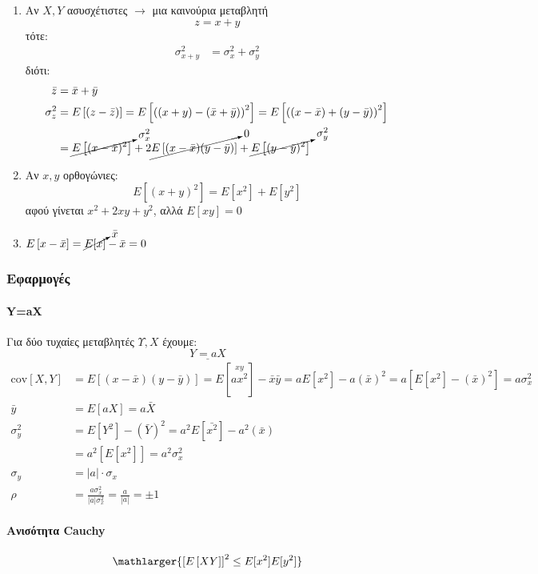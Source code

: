\documentclass[11pt,a4paper,notitlepage,fleqn,final]{article}
\begin{document}
\begin{enumerate}
	\item
	Αν \( X,Y \) ασυσχέτιστες \( \rightarrow \) μια καινούρια
	μεταβλητή \[
	z = x+y
	\] τότε:
	\begin{align*}
	\sigma_{x+y}^2 &= \sigma_x^2+\sigma_y^2
	\end{align*}
	διότι: \begin{align*}
	\bar z &= \bar x + \bar y \\
	\sigma_z^2 &= E\left[(z-\bar z)\right] = E\left[
	\left((x+y)-(\bar x+\bar y)\right)^2
	\right]
	= E\left[
	\left((x-\bar x)+(y-\bar y)\right)^2
	\right] \\ &=
	\cancelto{\sigma_x^2}{E\left[(x-\bar x)^2\right]}
	+ 2\cancelto{0}{E\left[(x-\bar x)(y-\bar y)\right]}
	+ \cancelto{\sigma_y^2}{E\left[(y-\bar y)^2\right]}
	\end{align*}
	\item Αν \( x,y \) ορθογώνιες:
	\[
	E\left[(x+y)^2\right] = E[x^2]+E[y^2]
	\] αφού γίνεται \( x^2+2xy+y^2 \), αλλά \( E[xy]=0 \)
	\item \( \displaystyle
	E\left[x-\bar x\right] = \cancelto{\bar x}{E[x]} - \bar x
	= 0
	\)
\end{enumerate}

\subsubsection{Εφαρμογές}

\paragraph{Y=aX}
Για δύο τυχαίες μεταβλητές \( Υ,Χ \) έχουμε:
\[
\underline{Y= aX}
\]
\begin{align*}
	\mathrm{cov}[X,Y] &= E\left[(x-\bar x)(y-\bar y)\right]
	= E\left[\overset{xy}{ax^2}\right] - \bar x \bar y
	= aE[x^2]-a(\bar x)^2 = a\left[E[x^2]-(\bar x)^2\right]
	= a\sigma_x^2 \\
	\bar{y} &= E\left[ aX \right] = a \bar{X} \\
	\sigma_y^2 &= E\left[ Y^2 \right] - \left( \bar{Y} \right)^2
	= a^2 E \left[ \bar{x^2} \right] - a^2\left(\bar{x}\right)
	\\ &= a^2\left[E\left[x^2\right]\right] = a^2\sigma_x^2 \\
	\sigma_y &= |a|\cdot\sigma_x \\
	\rho &= \frac{a\sigma_x^2}{|a|\sigma_x^2} = \frac{a}{|a|} = \pm 1
\end{align*}

\paragraph{Ανισότητα Cauchy}
\[
\mathlarger{\left[E\left[XY\right]\right]^2 \leq
E[x^2]E[y^2]}
\]
\end{document}
